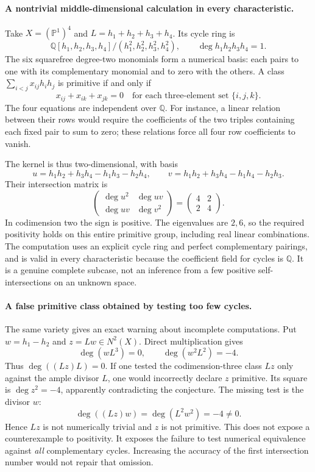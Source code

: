 \documentclass[11pt]{article}
\begin{document}
\paragraph{A nontrivial middle-dimensional calculation in every characteristic.}
Take $X=(\mathbb P^1)^4$ and $L=h_1+h_2+h_3+h_4$. Its cycle ring is
\[
 \mathbb Q[h_1,h_2,h_3,h_4]/(h_1^2,h_2^2,h_3^2,h_4^2),
 \qquad \deg h_1h_2h_3h_4=1.
\]
The six squarefree degree-two monomials form a numerical basis:
each pairs to one with its complementary monomial and to zero with
the others. A class $\sum_{i<j}x_{ij}h_ih_j$ is primitive if and only if
\[
 x_{ij}+x_{ik}+x_{jk}=0
 \quad\text{for each three-element set }\{i,j,k\}.
\]
The four equations are independent over $\mathbb Q$. For instance,
a linear relation between their rows would require the coefficients
of the two triples containing each fixed pair to sum to zero; these
relations force all four row coefficients to vanish.

The kernel is thus two-dimensional, with basis
\[
 u=h_1h_2+h_3h_4-h_1h_3-h_2h_4,\qquad
 v=h_1h_2+h_3h_4-h_1h_4-h_2h_3.
\]
Their intersection matrix is
\begin{equation}\label{nh:gram}
 \begin{pmatrix}\deg u^2&\deg uv\\\deg uv&\deg v^2\end{pmatrix}
 =\begin{pmatrix}4&2\\2&4\end{pmatrix}.
\end{equation}
In codimension two the sign is positive. The eigenvalues are $2,6$,
so the required positivity holds on this entire primitive group,
including real linear combinations. The computation uses an explicit
cycle ring and perfect complementary pairings, and is valid in every
characteristic because the coefficient field for cycles is $\mathbb Q$.
It is a genuine complete subcase, not an inference from a few positive
self-intersections on an unknown space.

\paragraph{A false primitive class obtained by testing too few cycles.}
The same variety gives an exact warning about incomplete computations.
Put $w=h_1-h_2$ and $z=Lw\in N^2(X)$. Direct multiplication gives
\[
 \deg(wL^3)=0,\qquad \deg(w^2L^2)=-4.
\]
Thus $\deg((Lz)L)=0$. If one tested the codimension-three class $Lz$
only against the ample divisor $L$, one would incorrectly declare
$z$ primitive. Its square is $\deg z^2=-4$, apparently contradicting
the conjecture. The missing test is the divisor $w$:
\[
 \deg((Lz)w)=\deg(L^2w^2)=-4\ne0.
\]
Hence $Lz$ is not numerically trivial and $z$ is not primitive.
This does not expose a counterexample to positivity. It exposes the
failure to test numerical equivalence against \emph{all} complementary
cycles. Increasing the accuracy of the first intersection number would
not repair that omission.
\end{document}
